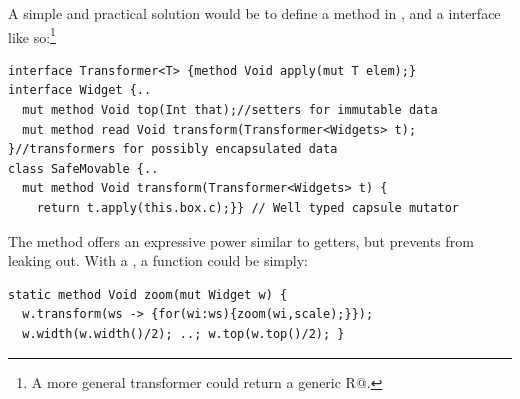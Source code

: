 A simple and practical solution would be to define a \Q@transform@ method in \Q@Widget@, and a \Q@Transformer@ interface 
like so:\footnote{A more general transformer could return a generic \Q@read R@.}
\saveSpace
\begin{lstlisting}
interface Transformer<T> {method Void apply(mut T elem);}
interface Widget {..
  mut method Void top(Int that);//setters for immutable data
  mut method read Void transform(Transformer<Widgets> t);
}//transformers for possibly encapsulated data
class SafeMovable {..
  mut method Void transform(Transformer<Widgets> t) {
    return t.apply(this.box.c);}} // Well typed capsule mutator
\end{lstlisting}\saveSpace
The \Q@transform@ method offers an expressive power similar to \Q@mut@ getters, but prevents \Q@Widgets@ from leaking out.  With a \Q@Transformer@, a \Q@zoom@ function could be simply:
\saveSpace\begin{lstlisting}
static method Void zoom(mut Widget w) {
  w.transform(ws -> {for(wi:ws){zoom(wi,scale);}});
  w.width(w.width()/2); ..; w.top(w.top()/2); }
\end{lstlisting}\saveSpace
\saveSpace
\saveSpace



